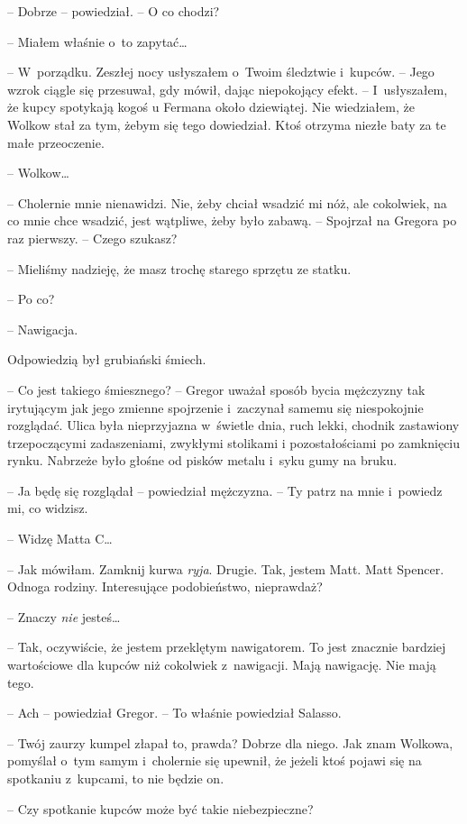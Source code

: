 \documentclass[oneside,polish,12pt,sfheadings]{mwbk}
\begin{document}
-- Dobrze -- powiedział. -- O co chodzi?

-- Miałem właśnie o~to zapytać\ldots

-- W~porządku. Zeszłej nocy usłyszałem o~Twoim śledztwie i~kupców. -- Jego
wzrok ciągle się przesuwał, gdy mówił, dając niepokojący efekt. -- I~usłyszałem, że kupcy spotykają kogoś u Fermana około dziewiątej. Nie
wiedziałem, że Wolkow stał za tym, żebym się tego dowiedział. Ktoś
otrzyma niezłe baty za te małe przeoczenie.

-- Wolkow\ldots

-- Cholernie mnie nienawidzi. Nie, żeby chciał wsadzić mi nóż, ale
cokolwiek, na co mnie chce wsadzić, jest wątpliwe, żeby było zabawą. --
Spojrzał na Gregora po raz pierwszy. -- Czego szukasz?

-- Mieliśmy nadzieję, że masz trochę starego sprzętu ze statku.

-- Po co?

-- Nawigacja.

Odpowiedzią był grubiański śmiech.

-- Co jest takiego śmiesznego? -- Gregor uważał sposób bycia mężczyzny tak
irytującym jak jego zmienne spojrzenie i~zaczynał samemu się
niespokojnie rozglądać. Ulica była nieprzyjazna w~świetle dnia, ruch
lekki, chodnik zastawiony trzepoczącymi zadaszeniami, zwykłymi stolikami
i pozostałościami po zamknięciu rynku. Nabrzeże było głośne od pisków
metalu i~syku gumy na bruku.

-- Ja będę się rozglądał -- powiedział mężczyzna. -- Ty patrz na mnie i~powiedz mi, co widzisz.

-- Widzę Matta C\ldots

-- Jak mówiłam. Zamknij kurwa \emph{ryja}. Drugie. Tak, jestem Matt. Matt
Spencer. Odnoga rodziny. Interesujące podobieństwo, nieprawdaż?

-- Znaczy \emph{nie} jesteś\ldots

-- Tak, oczywiście, że jestem przeklętym nawigatorem. To jest znacznie
bardziej wartościowe dla kupców niż cokolwiek z~nawigacji. Mają
nawigację. Nie mają tego.

-- Ach -- powiedział Gregor. -- To właśnie powiedział Salasso.

-- Twój zaurzy kumpel złapał to, prawda? Dobrze dla niego. Jak znam
Wolkowa, pomyślał o~tym samym i~cholernie się upewnił, że jeżeli ktoś
pojawi się na spotkaniu z~kupcami, to nie będzie on.

-- Czy spotkanie kupców może być takie niebezpieczne?
\end{document}
